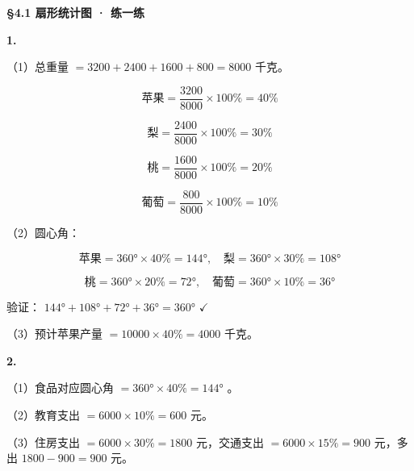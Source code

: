 \begin{answer}


\textbf{§4.1 扇形统计图 · 练一练}

\textbf{1.}

（1）总重量 $= 3200 + 2400 + 1600 + 800 = 8000$ 千克。

\[
\text{苹果} = \frac{3200}{8000} \times 100\% = 40\%
\]


\[
\text{梨} = \frac{2400}{8000} \times 100\% = 30\%
\]


\[
\text{桃} = \frac{1600}{8000} \times 100\% = 20\%
\]


\[
\text{葡萄} = \frac{800}{8000} \times 100\% = 10\%
\]


（2）圆心角：

\[
\text{苹果} = 360° \times 40\% = 144°, \quad \text{梨} = 360° \times 30\% = 108°
\]


\[
\text{桃} = 360° \times 20\% = 72°, \quad \text{葡萄} = 360° \times 10\% = 36°
\]


验证： $144° + 108° + 72° + 36° = 360°$ $\checkmark$

（3）预计苹果产量 $= 10000 \times 40\% = 4000$ 千克。

\textbf{2.}

（1）食品对应圆心角 $= 360° \times 40\% = 144°$ 。

（2）教育支出 $= 6000 \times 10\% = 600$ 元。

（3）住房支出 $= 6000 \times 30\% = 1800$ 元，交通支出 $= 6000 \times 15\% = 900$ 元，多出 $1800 - 900 = 900$ 元。

\end{answer}

